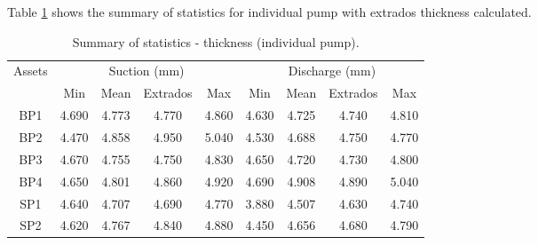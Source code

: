 Table \ref{ch05_tbl_thicknessextra} shows the summary of statistics for individual pump with extrados thickness calculated.
\begin{table}[h]
	\caption{Summary of statistics - thickness (individual pump).}
	\label{ch05_tbl_thicknessextra}
	{\footnotesize
\begin{tabular}{l|l|l|l|l|l|l|l|l}
\hline
\multicolumn{1}{c|}{Assets} & \multicolumn{4}{c|}{Suction (mm)} & \multicolumn{4}{c}{Discharge (mm)} \\ 
\cline{2-9}
\multicolumn{1}{c|}{} & \multicolumn{1}{c|}{Min} & \multicolumn{1}{c|}{Mean} & \multicolumn{1}{c|}{Extrados} & \multicolumn{1}{c|}{Max} & \multicolumn{1}{c|}{Min} & \multicolumn{1}{c|}{Mean} & \multicolumn{1}{c|}{Extrados} & \multicolumn{1}{c}{Max} \\ 
\hline
\multicolumn{1}{c|}{BP1} & \multicolumn{1}{c|}{4.690} & \multicolumn{1}{c|}{4.773} & \multicolumn{1}{c|}{4.770} & \multicolumn{1}{c|}{4.860} & \multicolumn{1}{c|}{4.630} & \multicolumn{1}{c|}{4.725} & \multicolumn{1}{c|}{4.740} & \multicolumn{1}{c}{4.810} \\ 
\multicolumn{1}{c|}{BP2} & \multicolumn{1}{c|}{4.470} & \multicolumn{1}{c|}{4.858} & \multicolumn{1}{c|}{4.950} & \multicolumn{1}{c|}{5.040} & \multicolumn{1}{c|}{4.530} & \multicolumn{1}{c|}{4.688} & \multicolumn{1}{c|}{4.750} & \multicolumn{1}{c}{4.770} \\ 
\multicolumn{1}{c|}{BP3} & \multicolumn{1}{c|}{4.670} & \multicolumn{1}{c|}{4.755} & \multicolumn{1}{c|}{4.750} & \multicolumn{1}{c|}{4.830} & \multicolumn{1}{c|}{4.650} & \multicolumn{1}{c|}{4.720} & \multicolumn{1}{c|}{4.730} & \multicolumn{1}{c}{4.800} \\ 
\multicolumn{1}{c|}{BP4} & \multicolumn{1}{c|}{4.650} & \multicolumn{1}{c|}{4.801} & \multicolumn{1}{c|}{4.860} & \multicolumn{1}{c|}{4.920} & \multicolumn{1}{c|}{4.690} & \multicolumn{1}{c|}{4.908} & \multicolumn{1}{c|}{4.890} & \multicolumn{1}{c}{5.040} \\ 
\multicolumn{1}{c|}{SP1} & \multicolumn{1}{c|}{4.640} & \multicolumn{1}{c|}{4.707} & \multicolumn{1}{c|}{4.690} & \multicolumn{1}{c|}{4.770} & \multicolumn{1}{c|}{3.880} & \multicolumn{1}{c|}{4.507} & \multicolumn{1}{c|}{4.630} & \multicolumn{1}{c}{4.740} \\ 
\multicolumn{1}{c|}{SP2} & \multicolumn{1}{c|}{4.620} & \multicolumn{1}{c|}{4.767} & \multicolumn{1}{c|}{4.840} & \multicolumn{1}{c|}{4.880} & \multicolumn{1}{c|}{4.450} & \multicolumn{1}{c|}{4.656} & \multicolumn{1}{c|}{4.680} & \multicolumn{1}{c}{4.790} \\ 
\hline
\end{tabular}

	}
\end{table}

